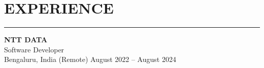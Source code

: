 \documentclass[11pt]{article}
\begin{document}
\section*{EXPERIENCE}
\vspace{-1.2em}
\noindent\rule{\linewidth}{0.4pt}
\textbf{NTT DATA} \\
Software Developer \\
Bengaluru, India (Remote) \hfill August 2022 -- August 2024
\begin{itemize}[leftmargin=15pt,itemsep=-6pt]
  



\end{itemize}
\end{document}

